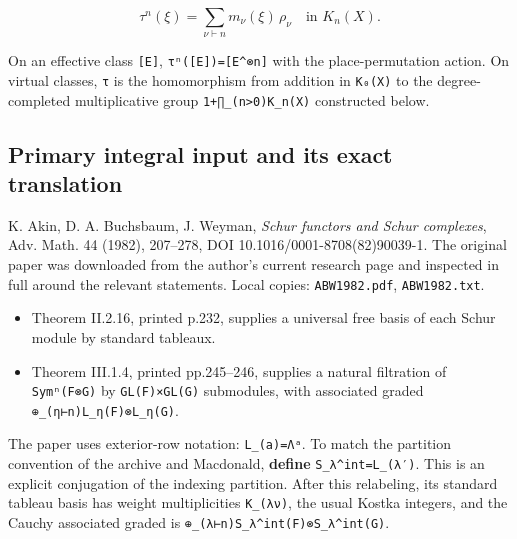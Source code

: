 \documentclass[
  10pt,
]{article}
\providecommand{\tightlist}{%
  \setlength{\itemsep}{0pt}\setlength{\parskip}{0pt}}
\providecommand{\tightlist}{\setlength{\itemsep}{0pt}\setlength{\parskip}{0pt}}
\begin{document}
\[
\tau^n(\xi)=\sum_{\nu\vdash n}m_\nu(\xi)\,\rho_\nu
\quad\text{in }K_n(X).
\tag{A12.1}
\]

On an effective class \texttt{\small [\allowbreak{}E]\allowbreak{}},
\texttt{\small τⁿ(\allowbreak{}[\allowbreak{}E]\allowbreak{})\allowbreak{}=\allowbreak{}[\allowbreak{}E\textasciicircum{}⊗\allowbreak{}n]\allowbreak{}}
with the place-permutation action. On virtual classes, \texttt{\small τ}
is the homomorphism from addition in
\texttt{\small K₀(\allowbreak{}X)\allowbreak{}} to the degree-completed
multiplicative group
\texttt{\small 1+\allowbreak{}∏\_\allowbreak{}(\allowbreak{}n>0)\allowbreak{}K\_\allowbreak{}n(\allowbreak{}X)\allowbreak{}}
constructed below.

\subsection{Primary integral input and its exact
translation}\label{primary-integral-input-and-its-exact-translation}

K. Akin, D. A. Buchsbaum, J. Weyman, \emph{Schur functors and Schur
complexes}, Adv. Math. 44 (1982), 207--278, DOI
10.1016/0001-8708(82)90039-1. The original paper was downloaded from the
author's current research page and inspected in full around the relevant
statements. Local copies: \texttt{\small ABW1982.pdf},
\texttt{\small ABW1982.txt}.

\begin{itemize}
\tightlist
\item
  Theorem II.2.16, printed p.232, supplies a universal free basis of
  each Schur module by standard tableaux.
\item
  Theorem III.1.4, printed pp.245--246, supplies a natural filtration of
  \texttt{\small Symⁿ(\allowbreak{}F⊗\allowbreak{}G)\allowbreak{}} by
  \texttt{\small GL(\allowbreak{}F)\allowbreak{}×GL(\allowbreak{}G)\allowbreak{}}
  submodules, with associated graded
  \texttt{\small ⊕\allowbreak{}\_\allowbreak{}(\allowbreak{}η⊢n)\allowbreak{}L\_\allowbreak{}η(\allowbreak{}F)\allowbreak{}⊗\allowbreak{}L\_\allowbreak{}η(\allowbreak{}G)\allowbreak{}}.
\end{itemize}

The paper uses exterior-row notation:
\texttt{\small L\_\allowbreak{}(\allowbreak{}a)\allowbreak{}=\allowbreak{}Λᵃ}.
To match the partition convention of the archive and Macdonald,
\textbf{define}
\texttt{\small S\_\allowbreak{}λ\textasciicircum{}int=\allowbreak{}L\_\allowbreak{}(\allowbreak{}λ′)\allowbreak{}}.
This is an explicit conjugation of the indexing partition. After this
relabeling, its standard tableau basis has weight multiplicities
\texttt{\small K\_\allowbreak{}(\allowbreak{}λν)\allowbreak{}}, the
usual Kostka integers, and the Cauchy associated graded is
\texttt{\small ⊕\allowbreak{}\_\allowbreak{}(\allowbreak{}λ⊢n)\allowbreak{}S\_\allowbreak{}λ\textasciicircum{}int(\allowbreak{}F)\allowbreak{}⊗\allowbreak{}S\_\allowbreak{}λ\textasciicircum{}int(\allowbreak{}G)\allowbreak{}}.
\end{document}
